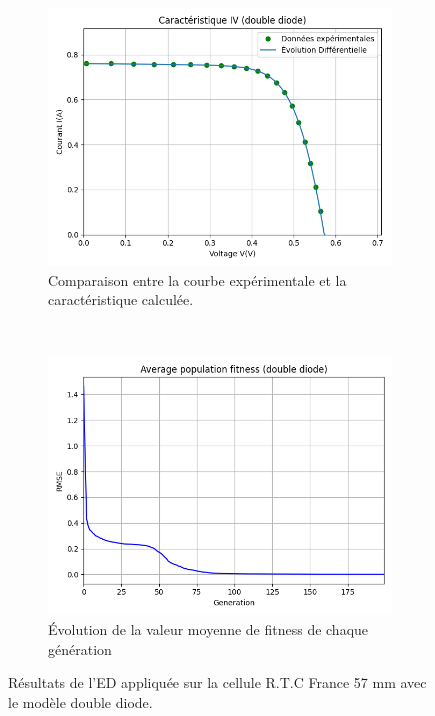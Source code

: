 \begin{figure}[h]
    \centering
    \begin{subfigure}[b]{0.45\textwidth}
        \includegraphics[width=\textwidth]{resources/RTCFrance/doubled/iv.png}
        \caption{Comparaison entre la courbe expérimentale et la caractéristique calculée.}
    \end{subfigure}
    ~
    \begin{subfigure}[b]{0.45\textwidth}
        \includegraphics[width=\textwidth]{resources/RTCFrance/doubled/fitness.png}
        \caption{Évolution de la valeur moyenne de fitness de chaque génération}
    \end{subfigure}
    \caption{Résultats de l'ED appliquée sur la cellule R.T.C France 57 mm avec le modèle double diode.}
    \label{fig:RTCdoublecarac}
\end{figure}
